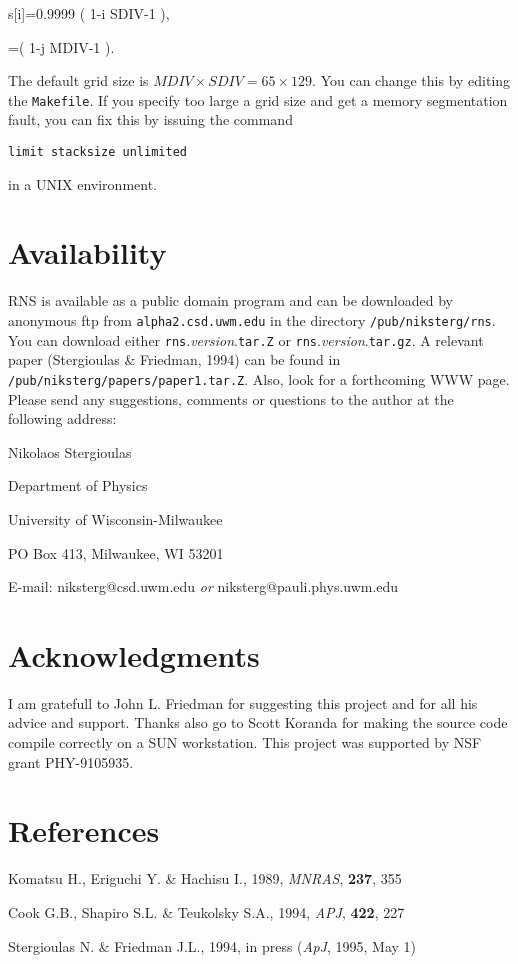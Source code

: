 \bee s[i]=0.9999 \Bigl( {1-i \over SDIV-1} \Bigr), \ee

\bee \mu[j]=\Bigl( {1-j \over MDIV-1} \Bigr). \ee

\<The default grid size is $MDIV \times SDIV=65 \times 129$. You can change this 
by editing the {\tt Makefile}. If you specify too large a grid size and get a 
memory segmentation fault, you can fix this by issuing the command 

\vspace{0.2cm}

{\tt limit stacksize unlimited}

\vspace{0.2cm}

\<in a UNIX environment.

\section{Availability}

RNS is available as a public domain program and can be downloaded by anonymous
ftp from {\tt alpha2.csd.uwm.edu} in the directory 
{\tt /pub/niksterg/rns}. 
You can download either {\tt rns}.{\it version}.{\tt tar.Z} or 
{\tt rns}.{\it version}.{\tt tar.gz}. A relevant paper (Stergioulas \&
Friedman, 1994) can be found in 
{\tt /pub/niksterg/papers/paper1.tar.Z}.
Also, look for a forthcoming WWW page. Please send any suggestions, comments or
questions to the author at the following address:

\vspace{0.2cm}

\< \hspace{0.7cm} Nikolaos Stergioulas

\< \hspace{0.7cm} Department of Physics

\< \hspace{0.7cm} University of Wisconsin-Milwaukee

\< \hspace{0.7cm} PO Box 413, Milwaukee, WI 53201

\< \hspace{0.7cm} E-mail: niksterg@csd.uwm.edu {\it or} niksterg@pauli.phys.uwm.edu 

\section{Acknowledgments}

I am gratefull to John L. Friedman for suggesting this project and for all his
advice and support. Thanks also go to Scott Koranda for making the source code
compile correctly on a SUN workstation. This project was supported by NSF
grant PHY-9105935.

\section{References}

Komatsu H., Eriguchi Y. \& Hachisu I., 1989, {\it MNRAS}, {\bf 237}, 355

\<Cook G.B., Shapiro S.L. \& Teukolsky S.A., 1994, {\it APJ}, {\bf 422}, 227

\<Stergioulas N. \& Friedman J.L., 1994, in press ({\it ApJ}, 1995, May 1)

  


